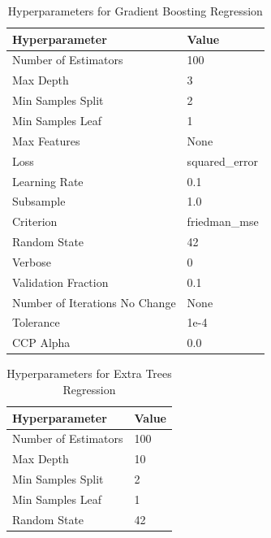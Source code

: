 \begin{table}[H]
\centering
\caption{Hyperparameters for Gradient Boosting Regression}
\begin{tabular}{ll}
    \toprule
    \textbf{Hyperparameter} & \textbf{Value} \\
    \midrule
    Number of Estimators & 100 \\
    Max Depth & 3 \\
    Min Samples Split & 2 \\
    Min Samples Leaf & 1 \\
    Max Features & None \\
    Loss & squared\_error \\
    Learning Rate & 0.1 \\
    Subsample & 1.0 \\
    Criterion & friedman\_mse \\
    Random State & 42 \\
    Verbose & 0 \\
    Validation Fraction & 0.1 \\
    Number of Iterations No Change & None \\
    Tolerance & 1e-4 \\
    CCP Alpha & 0.0 \\
    \bottomrule
\end{tabular}
\label{tab:gbr_hyperparameters}
\end{table}
\FloatBarrier

\begin{table}[H]
\centering
\caption{Hyperparameters for Extra Trees Regression}
\begin{tabular}{ll}
    \toprule
    \textbf{Hyperparameter} & \textbf{Value} \\
    \midrule
    Number of Estimators & 100 \\
    Max Depth & 10 \\
    Min Samples Split & 2 \\
    Min Samples Leaf & 1 \\
    Random State & 42 \\
    \bottomrule
\end{tabular}
\label{tab:extratrees_hyperparameters}
\end{table}
\FloatBarrier

